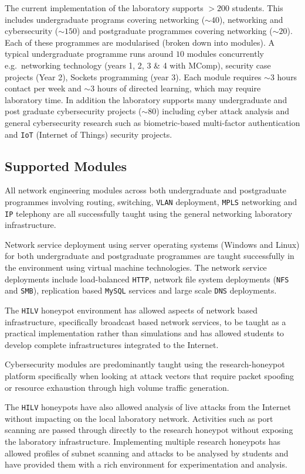 \documentclass{llncs}
\begin{document}
The current implementation of the laboratory supports $>200$ students. This
includes undergraduate programs covering networking ($\sim40$), networking and
cybersecurity ($\sim150$) and postgraduate programmes covering networking
($\sim20$). Each of these programmes are modularised (broken down into
modules).  A typical undergraduate programme runs around $10$ modules
concurrently e.g.\ networking technology (years 1, 2, 3 \& 4 with MComp),
security case projects (Year 2), Sockets programming (year 3). Each module
requires $\sim3$ hours contact per week and $\sim3$ hours of directed learning,
which may require laboratory time. In addition the laboratory supports many
undergraduate and post graduate cybersecurity projects ($\sim80$) including
cyber attack analysis and general cybersecurity research such as
biometric-based multi-factor authentication and \texttt{IoT} (Internet of
Things) security projects.

\subsection{Supported Modules\label{Modules}}

All network engineering modules across both undergraduate and postgraduate
programmes involving routing, switching, \texttt{VLAN} deployment,
\texttt{MPLS} networking and \texttt{IP} telephony are all successfully taught
using the general networking laboratory infrastructure.

Network service deployment using server operating systems (Windows and Linux)
for both undergraduate and postgraduate programmes are taught successfully in
the environment using virtual machine technologies. The network service
deployments include load-balanced \texttt{HTTP}, network file system
deployments (\texttt{NFS} and \texttt{SMB}), replication based \texttt{MySQL}
services and large scale \texttt{DNS} deployments.

The \texttt{HILV} honeypot environment has allowed aspects of network based
infrastructure, specifically broadcast based network services, to be taught as
a practical implementation rather than simulations and has allowed students to
develop complete infrastructures integrated to the Internet.

Cybersecurity modules are predominantly taught using the research-honeypot
platform specifically when looking at attack vectors that require packet
spoofing or resource exhaustion through high volume traffic generation.

The \texttt{HILV} honeypots have also allowed analysis of live attacks from the
Internet without impacting on the local laboratory network. Activities such as
port scanning are passed through directly to the research honeypot without
exposing the laboratory infrastructure. Implementing multiple research
honeypots has allowed profiles of subnet scanning and attacks to be analysed by
students and have provided them with a rich environment for experimentation and
analysis.
\end{document}

